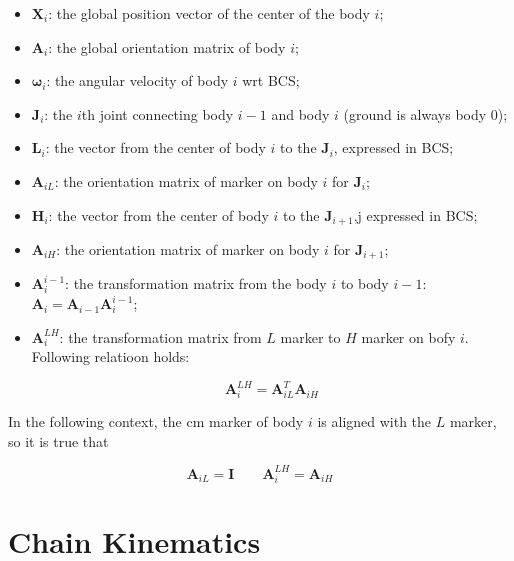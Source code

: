 \documentclass{article}
\begin{document}
\begin{itemize}

\item ${\mathbf X}_i$: the global position vector of the center of the body $i$;

\item ${\mathbf A}_i$: the global orientation matrix of body $i$; 

\item ${\mathbf \omega}_i$: the angular velocity of body $i$ wrt BCS;

\item ${\mathbf J}_i$: the $i$th joint connecting body $i-1$ and body $i$ (ground is always body $0$);

\item ${\mathbf L}_i$: the vector from the center of body $i$ to the ${\mathbf J}_i$, expressed in BCS;

\item ${\mathbf A}_{iL}$: the orientation matrix of marker on body $i$ for ${\mathbf J}_i$;

\item ${\mathbf H}_i$: the vector from the center of body $i$ to the ${\mathbf J}_{i+1}$,j expressed in BCS;

\item ${\mathbf A}_{iH}$: the orientation matrix of marker on body $i$ for ${\mathbf J}_{i+1}$;

\item ${\mathbf A}^{i-1}_i$: the transformation matrix from the body $i$ to body $i-1$: ${\mathbf A}_i = {\mathbf A}_{i-1}{\mathbf A}^{i-1}_i$;

\item ${\mathbf A}^{LH}_i$: the transformation matrix from $L$ marker to $H$ marker on bofy $i$. Following relatioon holds:

\begin{displaymath}
     \mathbf{A}^{LH}_i = \mathbf{A}^T_{iL}\mathbf{A}_{iH}
\end{displaymath}
\end{itemize}

In the following context, the cm marker of body $i$ is aligned with the $L$ marker, so it is true that

\begin{displaymath}
\mathbf{A}_{iL} = \mathbf{I}  \qquad \mathbf{A}^{LH}_i = \mathbf{A}_{iH}
\end{displaymath}

\section{Chain Kinematics}
\end{document}
